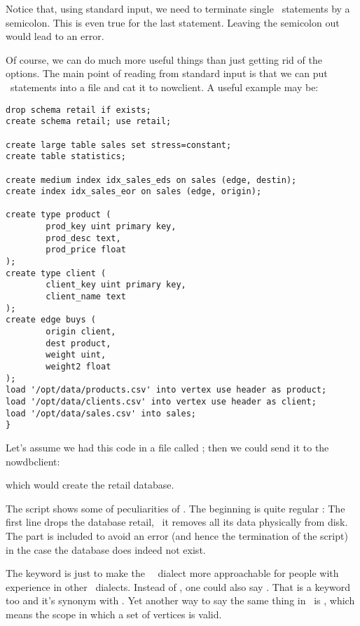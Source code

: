 
Notice that, using standard input,
we need to terminate single \sql\ statements
by a semicolon. This is even true for the last statement.
Leaving the semicolon out would lead to an error.

Of course, we can do much more useful things than just
getting rid of the options.
The main point of reading from standard input is
that we can put \sql\ statements into a file and
cat it to nowclient. A useful example may be:

\begingroup
\small
\begin{verbatim}
drop schema retail if exists;
create schema retail; use retail;

create large table sales set stress=constant;
create table statistics;

create medium index idx_sales_eds on sales (edge, destin);
create index idx_sales_eor on sales (edge, origin);

create type product (
        prod_key uint primary key,
        prod_desc text,
        prod_price float
);
create type client (
        client_key uint primary key,
        client_name text
);
create edge buys (
        origin client,
        dest product,
        weight uint,
        weight2 float
);
load '/opt/data/products.csv' into vertex use header as product;
load '/opt/data/clients.csv' into vertex use header as client;
load '/opt/data/sales.csv' into sales;
}
\end{verbatim}
\endgroup

Let's assume we had this code in a file called
; then we could
send it to the nowdbclient:


which would create the retail database.

The script shows some of peculiarities of \nowdb.
The beginning is quite regular \sql:
The first line drops the database retail,
\ie\ it removes all its data physically
from disk. The  part
is included to avoid an error 
(and hence the termination of the script)
in the case
the database does indeed not exist.

The keyword  is just to
make the \nowdb\ \sql\ dialect more
approachable for people with experience
in other \sql\ dialects. Instead of
, one could also say
. That is a keyword too
and it's synonym with .
Yet another way to say the same thing
in \nowdb\ is , which
means the scope in which a set of
vertices is valid.

